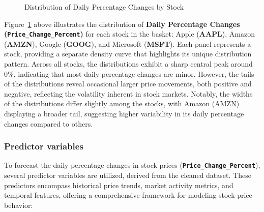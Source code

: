 \documentclass[
  letterpaper,
  DIV=11,
  numbers=noendperiod]{scrartcl}
\begin{document}
\begin{figure}


\caption{\label{fig-outcome-var}Distribution of Daily Percentage Changes
by Stock}

\end{figure}%

Figure~\ref{fig-outcome-var} above illustrates the distribution of
\textbf{Daily Percentage Changes (\texttt{Price\_Change\_Percent})} for
each stock in the basket: Apple (\textbf{AAPL}), Amazon (\textbf{AMZN}),
Google (\textbf{GOOG}), and Microsoft (\textbf{MSFT}). Each panel
represents a stock, providing a separate density curve that highlights
its unique distribution pattern. Across all stocks, the distributions
exhibit a sharp central peak around 0\%, indicating that most daily
percentage changes are minor. However, the tails of the distributions
reveal occasional larger price movements, both positive and negative,
reflecting the volatility inherent in stock markets. Notably, the widths
of the distributions differ slightly among the stocks, with Amazon
(AMZN) displaying a broader tail, suggesting higher variability in its
daily percentage changes compared to others.

\subsubsection{Predictor variables}\label{predictor-variables}

To forecast the daily percentage changes in stock prices
(\textbf{\texttt{Price\_Change\_Percent}}), several predictor variables
are utilized, derived from the cleaned dataset. These predictors
encompass historical price trends, market activity metrics, and temporal
features, offering a comprehensive framework for modeling stock price
behavior:
\end{document}
